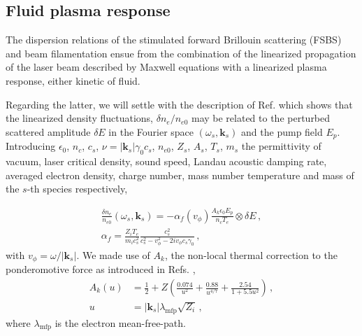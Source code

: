 \documentclass[
 reprint,
 amsmath,amssymb,
 aps,
]{revtex4-1}
\begin{document}
\subsection{Fluid plasma response}
The dispersion relations of the stimulated forward Brillouin scattering (FSBS) and beam filamentation ensue from the combination of the linearized propagation of the laser beam described by  Maxwell equations with a linearized plasma response, either kinetic of fluid. 

Regarding the latter, we will settle with the description of Ref. \cite[]{Ruyer_FSBS} which shows that the linearized density fluctuations, $\delta n_e /n_{e0}$ may be related to the  perturbed scattered  amplitude $\delta E$ in the Fourier space $(\omega_s,\mathbf{k}_s)$ and the pump field  $E_p$.
Introducing $\epsilon_0$, $n_c$, $c_s$, $\nu=\vert\mathbf{k}_s\vert \gamma_0 c_s$, $n_{e0}$, $Z_s$, $A_s$, $T_{s}$, $m_s$ the permittivity of vacuum, laser critical density, sound speed, Landau acoustic damping rate, averaged electron density, charge number, mass number temperature and mass of the $s$-th species respectively, 

\begin{align}
   \frac{\delta n_e }{n_{e0}}(\omega_s,\mathbf{k}_s) = -\alpha_{f}(v_\phi) \frac{A_k\epsilon_0 E_p}{n_c T_e}\otimes   \delta E  \, ,\label{eq:fd} \\
   \alpha_f = \frac{Z_iT_e}{m_ic_s^2} \frac{ c_s^2}{ c_s^2-v_\phi^2 -2iv_\phi c_s \gamma_0}\, , \label{eq:alphaf}
\end{align}
with $v_\phi = \omega/\vert \mathbf{k}_s\vert$.
We made use of %
$A_k$, the  non-local thermal correction to the ponderomotive force  as introduced in Refs. \cite[]{POP_Kaiser_1993,Bychenkov_2000}, 
\begin{align}
     A_k(u)   &= \frac{1}{2} +Z\left( \frac{0.074}{u^2}+ \frac{0.88}{u^{4/7}} + \frac{2.54}{1+5.5u^2} \right) \, ,\nonumber \\ 
     u &=\vert \mathbf{k}_s \vert\lambda_\mathrm{mfp} \sqrt{Z_i}\label{eq:nl}\, ,
\end{align}
where $\lambda_\mathrm{mfp}$ is the  electron mean-free-path.
\end{document}
